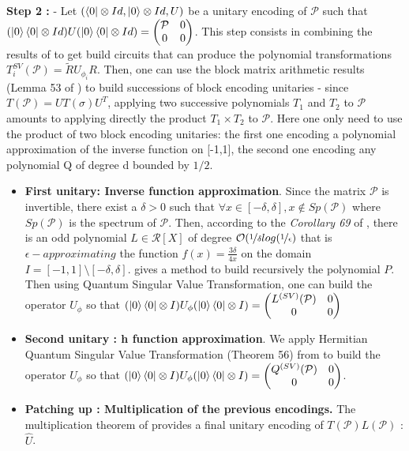 \documentclass{article}
\begin{document}
\textbf{Step 2 :} - Let $(\bra{0} \otimes Id, \ket{0} \otimes Id, U) $ be a unitary encoding of $\mathcal{P}$ such that $(\ket{0}\bra{0} \otimes Id) U (\ket{0}\bra{0} \otimes Id) = \begin{pmatrix} \mathcal{P} & 0 \\ 0 & 0 \end{pmatrix}$. This step consists in combining the results of \cite{gilyén_su_low_wiebe_2019} to get build circuits that can produce the polynomial transformations $T_i^{SV}(\mathcal{P}) = \widetilde{R} U_{\phi_i} R$. Then, one can use the block matrix arithmetic results (Lemma 53 of \cite{gilyén_su_low_wiebe_2019}) to build successions of block encoding unitaries - since $T(\mathcal{P}) = U T(\sigma) U^T$, applying two successive polynomials $T_1$ and $T_2$ to $\mathcal{P}$ amounts to applying directly the product $T_1 \times T_2$ to $\mathcal{P}$. Here one only need to use the product of two block encoding unitaries: the first one encoding a polynomial approximation of the inverse function on [-1,1], the second one encoding any polynomial Q of degree d bounded by $1/2$.

\begin{itemize}
    \item \textbf{First unitary: Inverse function approximation}. Since the matrix $\mathcal{P}$ is invertible, there exist a $\delta>0$ such that $\forall x \in [-\delta, \delta], x \not\in Sp(\mathcal{P})$ where $Sp(\mathcal{P})$ is the spectrum of $\mathcal{P}$. Then, according to the \textit{Corollary 69} of \cite{gilyén_su_low_wiebe_2019}, there is an odd polynomial $L \in \mathcal{R}[X]$ of degree $\mathcal{O}(\nicefrac{1}{\delta} log(\nicefrac{1}{\epsilon})$ that is $\epsilon-approximating$ the function $f(x) = \frac{3\delta}{4 x}$ on the domain $I = [-1, 1] \setminus [-\delta, \delta]$. \cite{gilyén_su_low_wiebe_2019} gives a method to build recursively the polynomial $P$. Then using Quantum Singular Value Transformation, one can build the operator $U_{\phi}$ so that $(\ket{0}\bra{0} \otimes I)U_{\phi}(\ket{0}\bra{0} \otimes I) = \begin{pmatrix} L^{(SV)}(\mathcal{P}) & 0 \\ 0 & 0 \end{pmatrix}$
    \item \textbf{Second unitary : h function approximation}. We apply Hermitian Quantum Singular Value Transformation (Theorem 56) from \cite{gilyén_su_low_wiebe_2019} to build the operator $U_{\phi}$ so that $(\ket{0}\bra{0} \otimes I)U_\phi (\ket{0}\bra{0} \otimes I) = \begin{pmatrix} Q^{(SV)}(\mathcal{P}) & 0 \\ 0 & 0 \end{pmatrix}$. 
    
    \item \textbf{Patching up : Multiplication of the previous encodings.} The multiplication theorem of \cite{gilyén_su_low_wiebe_2019} provides a final unitary encoding of $T(\mathcal{P}) L(\mathcal{P})$ : $\widehat{U}$.
    
\end{itemize}
\end{document}
